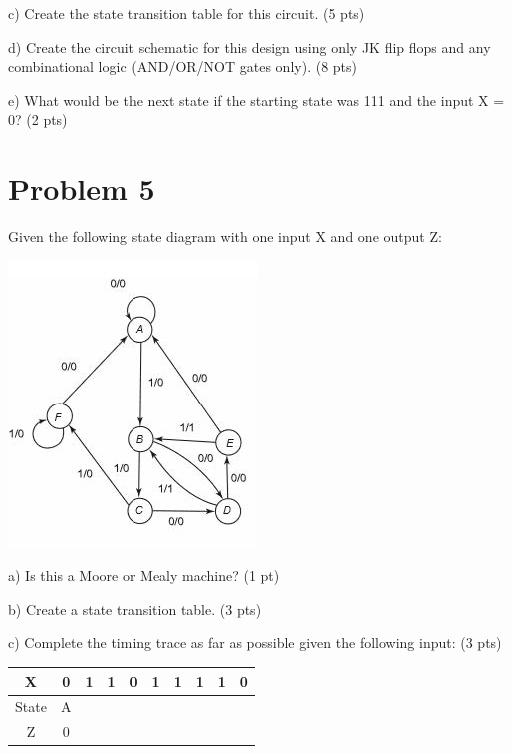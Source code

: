 \documentclass{article}
\begin{document}
    c) Create the state transition table for this circuit. (5 pts)

    d) Create the circuit schematic for this design using only JK flip flops and any combinational logic (AND/OR/NOT gates only). (8 pts)

    e) What would be the next state if the starting state was 111 and the input X = 0? (2 pts)


    \section*{Problem 5}

    Given the following state diagram with one input X and one output Z:

    \begin{center}
        \includegraphics{HW5_05_StateDiagram.jpg}
    \end{center}

    a) Is this a Moore or Mealy machine? (1 pt)

    b) Create a state transition table. (3 pts)

    c) Complete the timing trace as far as possible given the following input: (3 pts)

    \begin{center}
        \begin{tabular}{|c|c|c|c|c|c|c|c|c|c|}
            \hline
            X & 0 & 1 & 1 & 0 & 1 & 1 & 1 & 1 & 0 \\
            \hline
            State & A &&&&&&&& \\
            \hline
            Z & 0 &&&&&&&& \\
            \hline
        \end{tabular}
    \end{center}
\end{document}
